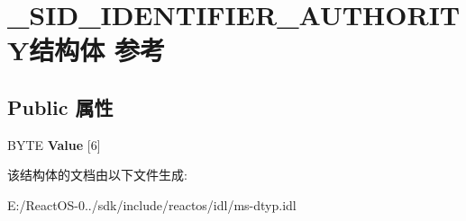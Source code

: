 \hypertarget{struct___s_i_d___i_d_e_n_t_i_f_i_e_r___a_u_t_h_o_r_i_t_y}{}\section{\+\_\+\+S\+I\+D\+\_\+\+I\+D\+E\+N\+T\+I\+F\+I\+E\+R\+\_\+\+A\+U\+T\+H\+O\+R\+I\+T\+Y结构体 参考}
\label{struct___s_i_d___i_d_e_n_t_i_f_i_e_r___a_u_t_h_o_r_i_t_y}
\subsection*{Public 属性}
\begin{DoxyCompactItemize}
\item 
\mbox{\label{struct___s_i_d___i_d_e_n_t_i_f_i_e_r___a_u_t_h_o_r_i_t_y_af18dd8303264f622447b121ac890700a}} 
B\+Y\+TE {\bfseries Value} \mbox{[}6\mbox{]}
\end{DoxyCompactItemize}


该结构体的文档由以下文件生成\+:\begin{DoxyCompactItemize}
\item 
E\+:/\+React\+O\+S-\/0../sdk/include/reactos/idl/ms-\/dtyp.\+idl\end{DoxyCompactItemize}
